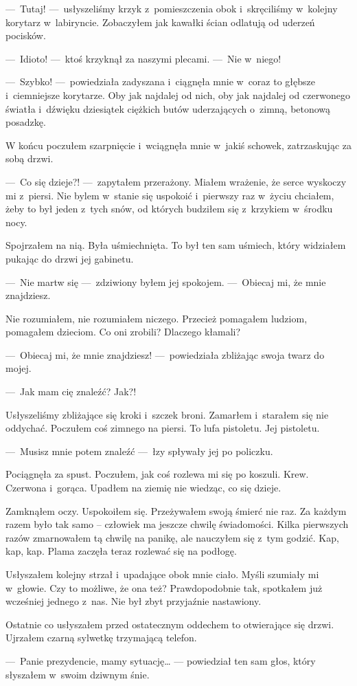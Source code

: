 ---~Tutaj! ---~usłyszeliśmy krzyk z~pomieszczenia obok i~skręciliśmy w~kolejny korytarz w~labiryncie. Zobaczyłem jak kawałki ścian odlatują od uderzeń pocisków. 

---~Idioto! ---~ktoś krzyknął za naszymi plecami. ---~Nie w~niego!

---~Szybko! ---~powiedziała zadyszana i~ciągnęła mnie w~coraz to głębsze i~ciemniejsze korytarze. Oby jak najdalej od nich, oby jak najdalej od czerwonego światła i~dźwięku dziesiątek ciężkich butów uderzających o~zimną, betonową posadzkę.

W końcu poczułem szarpnięcie i~wciągnęła mnie w~jakiś schowek, zatrzaskując za sobą drzwi. 

---~Co się dzieje?! ---~zapytałem przerażony. Miałem wrażenie, że serce wyskoczy mi z~piersi. Nie bylem w~stanie się uspokoić i~pierwszy raz w~życiu chciałem, żeby to był jeden z~tych snów, od których budziłem się z~krzykiem w~środku nocy. 

Spojrzałem na nią. Była uśmiechnięta. To był ten sam uśmiech, który widziałem pukając do drzwi jej gabinetu. 

---~Nie martw się ---~zdziwiony byłem jej spokojem. ---~Obiecaj mi, że mnie znajdziesz. 

Nie rozumiałem, nie rozumiałem niczego. Przecież pomagałem ludziom, pomagałem dzieciom. Co oni zrobili? Dlaczego kłamali?

---~Obiecaj mi, że mnie znajdziesz! ---~powiedziała zbliżając swoja twarz do mojej. 

---~Jak mam cię znaleźć? Jak?! 

Usłyszeliśmy zbliżające się kroki i~szczek broni. Zamarłem i~starałem się nie oddychać.
Poczułem coś zimnego na piersi. To lufa pistoletu.
Jej pistoletu. 

---~Musisz mnie potem znaleźć ---~łzy spływały jej po policzku. 

Pociągnęła za spust. Poczułem, jak coś rozlewa mi się po koszuli. Krew. Czerwona i~gorąca. Upadłem na ziemię nie wiedząc, co się dzieje. 

Zamknąłem oczy. Uspokoiłem się. Przeżywałem swoją śmierć nie raz. Za każdym razem było tak samo – człowiek ma jeszcze chwilę świadomości. Kilka pierwszych razów zmarnowałem tą chwilę na panikę, ale nauczyłem się z~tym godzić. Kap, kap, kap. Plama zaczęła teraz rozlewać się na podłogę. 

Usłyszałem kolejny strzał i~upadające obok mnie ciało. Myśli szumiały mi w~głowie. Czy to możliwe, że ona też? Prawdopodobnie tak, spotkałem już wcześniej jednego z~nas. Nie był zbyt przyjaźnie nastawiony.

Ostatnie co usłyszałem przed ostatecznym oddechem to otwierające się drzwi. Ujrzałem czarną sylwetkę trzymającą telefon.

---~Panie prezydencie, mamy sytuację… --- powiedział ten sam głos, który słyszałem w~swoim dziwnym śnie.  
